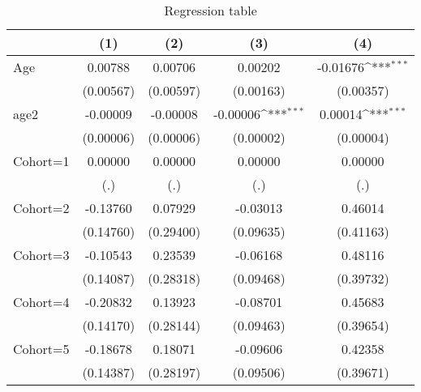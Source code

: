 \begin{table}[htbp]\centering
\def\sym#1{\ifmmode^{#1}\else\(^{#1}\)\fi}
\caption{Regression table \label{reg4}}
\begin{tabular}{l*{4}{c}}
\toprule
                    &\multicolumn{1}{c}{(1)}         &\multicolumn{1}{c}{(2)}         &\multicolumn{1}{c}{(3)}         &\multicolumn{1}{c}{(4)}         \\
\midrule
Age                 &     0.00788         &     0.00706         &     0.00202         &    -0.01676\sym{***}\\
                    &   (0.00567)         &   (0.00597)         &   (0.00163)         &   (0.00357)         \\
\addlinespace
age2                &    -0.00009         &    -0.00008         &    -0.00006\sym{***}&     0.00014\sym{***}\\
                    &   (0.00006)         &   (0.00006)         &   (0.00002)         &   (0.00004)         \\
\addlinespace
Cohort=1            &     0.00000         &     0.00000         &     0.00000         &     0.00000         \\
                    &         (.)         &         (.)         &         (.)         &         (.)         \\
\addlinespace
Cohort=2            &    -0.13760         &     0.07929         &    -0.03013         &     0.46014         \\
                    &   (0.14760)         &   (0.29400)         &   (0.09635)         &   (0.41163)         \\
\addlinespace
Cohort=3            &    -0.10543         &     0.23539         &    -0.06168         &     0.48116         \\
                    &   (0.14087)         &   (0.28318)         &   (0.09468)         &   (0.39732)         \\
\addlinespace
Cohort=4            &    -0.20832         &     0.13923         &    -0.08701         &     0.45683         \\
                    &   (0.14170)         &   (0.28144)         &   (0.09463)         &   (0.39654)         \\
\addlinespace
Cohort=5            &    -0.18678         &     0.18071         &    -0.09606         &     0.42358         \\
                    &   (0.14387)         &   (0.28197)         &   (0.09506)         &   (0.39671)         \\

\end{tabular}
\end{table}
